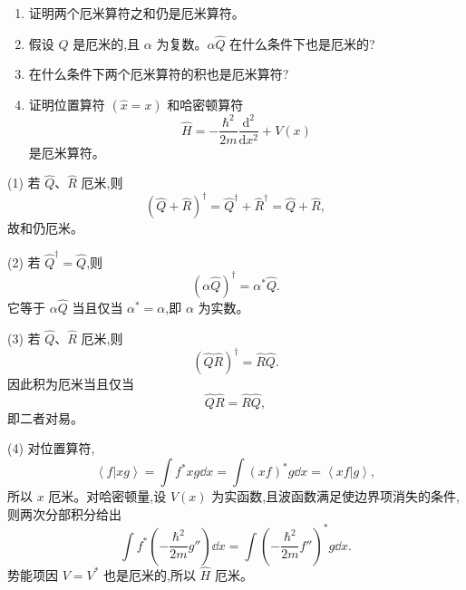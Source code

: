 \begin{question}
\begin{enumerate}
\item 证明两个厄米算符之和仍是厄米算符。
\item 假设 $\hat Q$ 是厄米的,且 $\alpha$ 为复数。$\alpha\hat Q$ 在什么条件下也是厄米的?
\item 在什么条件下两个厄米算符的积也是厄米算符?
\item 证明位置算符 $(\hat x=x)$ 和哈密顿算符
\[
\hat H=-\frac{\hbar^2}{2m}\frac{\mathrm d^2}{\mathrm dx^2}+V(x)
\]
是厄米算符。
\end{enumerate}
\end{question}
\begin{solution}
(1) 若 $\hat Q$、$\hat R$ 厄米,则
\[
(\hat Q+\hat R)^\dagger=\hat Q^\dagger+\hat R^\dagger=\hat Q+\hat R,
\]
故和仍厄米。

(2) 若 $\hat Q^\dagger=\hat Q$,则
\[
(\alpha\hat Q)^\dagger=\alpha^*\hat Q.
\]
它等于 $\alpha\hat Q$ 当且仅当 $\alpha^*=\alpha$,即 $\alpha$ 为实数。

(3) 若 $\hat Q$、$\hat R$ 厄米,则
\[
(\hat Q\hat R)^\dagger=\hat R\hat Q.
\]
因此积为厄米当且仅当
\[
\hat Q\hat R=\hat R\hat Q,
\]
即二者对易。

(4) 对位置算符,
\[
\left\langle f|xg \right\rangle=\int f^*xg\dd x=\int (xf)^*g\dd x=\left\langle xf|g \right\rangle,
\]
所以 $x$ 厄米。对哈密顿量,设 $V(x)$ 为实函数,且波函数满足使边界项消失的条件,则两次分部积分给出
\[
\int f^*\left(-\frac{\hbar^2}{2m}g''\right)\dd x
=\int \left(-\frac{\hbar^2}{2m}f''\right)^*g\dd x.
\]
势能项因 $V=V^*$ 也是厄米的,所以 $\hat H$ 厄米。
\end{solution}

